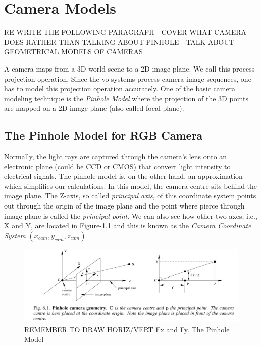 \documentclass[a4paper]{report}
\numberwithin{figure}{section}
\begin{document}
\chapter{Camera Models} \label{cp_cam_models}

RE-WRITE THE FOLLOWING PARAGRAPH - COVER WHAT CAMERA DOES RATHER THAN 
TALKING ABOUT PINHOLE - TALK ABOUT GEOMETRICAL MODELS OF CAMERAS

A camera maps from a 3D world scene to a 2D image plane. We call this process 
projection operation. Since the \acrshort{vo} systems process camera image 
sequences, one has to model this projection operation accurately. One of the 
basic camera modeling technique is the \textit{Pinhole Model} where the projection of 
the 3D points are mapped on a 2D image plane (also called focal plane). 

\section{The Pinhole Model for RGB Camera} \label{sbsc_pinhole}

Normally, the light rays 
are captured through the camera's lens onto an electronic plane (could be CCD or CMOS) 
that convert light intensity to electrical signals. 
The pinhole model is, on the other hand, an approximation which simplifies 
our calculations.
In this model, the camera centre sits behind the image plane.
The Z-axis, 
so called \textit{principal axis}, of this 
coordinate system points out through the origin of the image plane and the 
point where pierce through image plane is called the \textit{principal point}. 
We can also see how other two axes; i.e., X and Y, are located in Figure-\ref{fig:pinhole} 
and this is known as the \textit{Camera Coordinate System} $(x_{cam}, y_{cam}, z_{cam})$.


\begin{figure}[H]
	\centering
	\includegraphics[width=\linewidth,natwidth=640,natheight=640]
  {fig/ref_imgs/pinhole_model.png}
  \caption{REMEMBER TO DRAW HORIZ/VERT Fx and Fy. The Pinhole Model}
	\label{fig:pinhole}
\end{figure}
\end{document}
